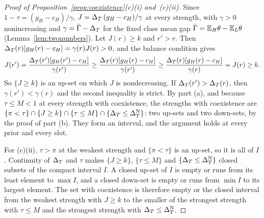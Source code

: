\begin{proof}[Proof of Proposition~\ref{prop:coexistence}(c)(i) and~(c)(ii)]
Since \(1-\tau=(g_H-c_H)/\gamma\), \(J=\Delta_T\,(g_H-c_H)/\gamma\) at every strength, with \(\gamma>0\) nonincreasing and
\(\gamma=\bar\Gamma-\Delta_T\) for the fixed class mean gap \(\bar\Gamma=\mathbb{E}_H\theta-\mathbb{E}_L\theta\) (Lemma~\ref{lem:twonumbers}).
Let \(J(r)\ge k\) and \(r'>r\). Then \(\Delta_T(r)[g_H(r)-c_H]=\gamma(r)J(r)>0\), and the balance condition gives
\[
J(r')=\frac{\Delta_T(r')[g_H(r')-c_H]}{\gamma(r')}\ge\frac{\Delta_T(r)[g_H(r)-c_H]}{\gamma(r')}
\ge\frac{\Delta_T(r)[g_H(r)-c_H]}{\gamma(r)}=J(r)\ge k .
\]
So \(\{J\ge k\}\) is an up-set on which \(J\) is nondecreasing. If \(\Delta_T(r')>\Delta_T(r)\), then \(\gamma(r')<\gamma(r)\) and the
second inequality is strict. By part (a), and because \(\tau\le M<1\) at every strength with coexistence, the
strengths with coexistence are \(\{\pi<\tau\}\cap\{J\ge k\}\cap\{\tau\le M\}\cap\{\Delta_T\le\Delta_T^{\rm N}\}\): two up-sets
and two down-sets, by the proof of part (b). They form an interval, and the argument holds at every prior and every
slot.

For (c)(ii), \(\tau>\pi\) at the weakest strength and \(\{\pi<\tau\}\) is an up-set, so it is all of \(I\). Continuity
of \(\Delta_T\) and \(\tau\) makes \(\{J\ge k\}\), \(\{\tau\le M\}\) and \(\{\Delta_T\le\Delta_T^{\rm N}\}\) closed subsets of the compact
interval \(I\). A closed up-set of \(I\) is empty or runs from its least element to \(\max I\), and a closed down-set
is empty or runs from \(\min I\) to its largest element. The set with coexistence is therefore empty or the closed
interval from the weakest strength with \(J\ge k\) to the smaller of the strongest strength with \(\tau\le M\) and
the strongest strength with \(\Delta_T\le\Delta_T^{\rm N}\).
\end{proof}

